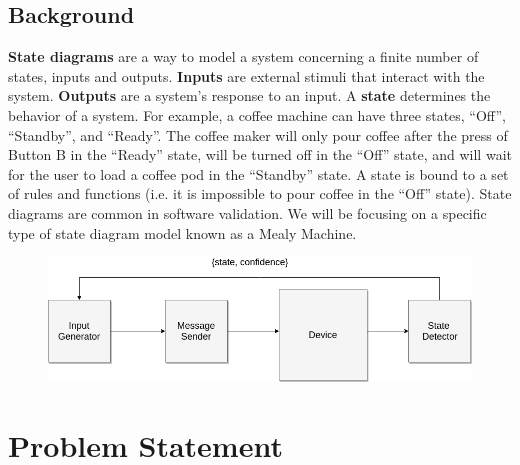 \documentclass[11pt, a4paper]{article}
\begin{document}
\subsection*{Background}

\textbf{State diagrams} are a way to model a system concerning a finite number of states, inputs and outputs.
\textbf{Inputs} are external stimuli that interact with the system.
\textbf{Outputs} are a system's response to an input.
A \textbf{state} determines the behavior of a system.
For example, a coffee machine can have three states, ``Off'', ``Standby'', and ``Ready''.
The coffee maker will only pour coffee after the press of Button B in the ``Ready'' state, will be turned off in the ``Off'' state, and will wait for the user to load a coffee pod in the ``Standby'' state.
A state is bound to a set of rules and functions (i.e. it is impossible to pour coffee in the ``Off'' state).
State diagrams are common in software validation.
We will be focusing on a specific type of state diagram model known as a Mealy Machine.


\begin{figure}
    \centering
    \includegraphics[scale=0.5]{state-detector.png}
    \label{The system under active model learning.}
\end{figure}

\section*{Problem Statement} 
\end{document}
